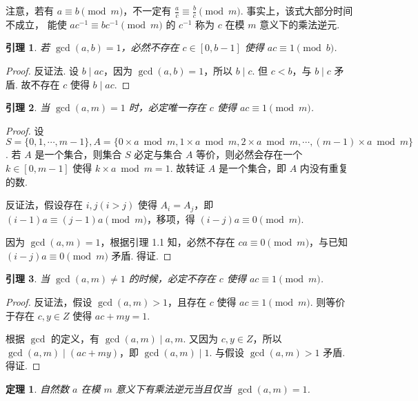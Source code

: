 \documentclass[a4paper]{article}
\newtheorem{theorem}{定理}[section]
\newtheorem{lemma}{引理}[section]
\begin{document}
注意，若有 $a\equiv b\pmod m$，不一定有 $\frac{a}{c}\equiv \frac{b}{c}\pmod m$. 事实上，该式大部分时间不成立，
能使 $ac^{-1}\equiv bc^{-1}\pmod m$ 的 $c^{-1}$ 称为 $c$ 在模 $m$ 意义下的乘法逆元.

\begin{lemma}
    若 $\gcd(a,b)=1$，必然不存在 $c\in [0,b-1]$ 使得 $ac\equiv 1\pmod b$.
\end{lemma}

\begin{proof}
    反证法. 设 $b\mid ac$，因为 $\gcd(a,b)=1$，所以 $b\mid c$. 但 $c<b$，与 $b\mid c$ 矛盾. 故不存在 $c$ 使得
    $b \mid ac$.
\end{proof}

\begin{lemma}
    当 $\gcd(a,m)=1$ 时，必定唯一存在 $c$ 使得 $ac\equiv 1\pmod m$.
\end{lemma}

\begin{proof}
    设 $S=\{0,1,\cdots,m-1\},A=\{0\times a \bmod m,1\times a \bmod m,2\times a \bmod m,\cdots,
        (m-1)\times a\bmod m\}$. 若 $A$ 是一个集合，则集合 $S$ 必定与集合 $A$ 等价，则必然会存在一个 $k\in[0
            ,m-1]$ 使得 $k\times a\bmod m=1$. 故转证 $A$ 是一个集合，即 $A$ 内没有重复的数.

    反证法，假设存在 $i,j(i>j)$ 使得 $A_i=A_j$，即 $(i-1)a\equiv (j-1)a\pmod m$，移项，得 $(i-j)a\equiv 0
        \pmod m$.

    因为 $\gcd(a,m)=1$，根据引理 1.1 知，必然不存在 $ca\equiv 0\pmod m$，与已知 $(i-j)a\equiv 0\pmod m$ 矛盾. 得证.
\end{proof}

\begin{lemma}
    当 $\gcd(a,m)\ne 1$ 的时候，必定不存在 $c$ 使得 $ac\equiv 1\pmod m$.
\end{lemma}

\begin{proof}
    反证法，假设 $\gcd(a,m)>1$，且存在 $c$ 使得 $ac\equiv 1\pmod m$. 则等价于存在 $c,y\in Z$ 使得 $ac+my=1$.

    根据 $\gcd$ 的定义，有 $\gcd(a,m)\mid a,m$. 又因为 $c,y\in Z$，所以 $\gcd(a,m)\mid (ac+my)$，即 $\gcd
        (a,m)\mid 1$. 与假设 $\gcd(a,m)>1$ 矛盾. 得证.
\end{proof}

\begin{theorem}
    自然数 $a$ 在模 $m$ 意义下有乘法逆元当且仅当 $\gcd(a,m)=1$.
\end{theorem}
\end{document}
